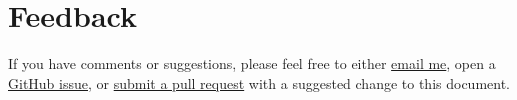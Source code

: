 
\section{Feedback}
\label{sec:feedback}

If you have comments or suggestions, please feel free to either \href{mailto:tex@adamliter.org}{email me}, open a \href{https://github.com/adamliter/latex-workshop/issues}{GitHub issue}, or \href{https://help.github.com/articles/creating-a-pull-request/}{submit a pull request} with a suggested change to this document.